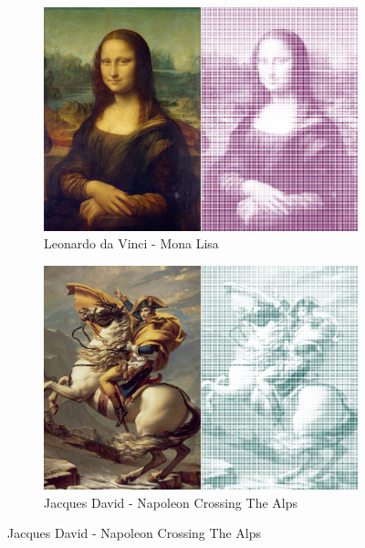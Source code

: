 \begin{figure}[H]
    \begin{subfigure}[b]{0.45\textwidth}
        \centering
        \includegraphics[width=\textwidth]{Figures/day_1/mona_lisa.png}
        \caption{Leonardo da Vinci - Mona Lisa}
    \end{subfigure}
    \hspace{1cm}
    \begin{subfigure}[b]{0.45\textwidth}
        \centering

        \includegraphics[width=\textwidth]{Figures/day_1/napoleon.png}
        \caption{Jacques David - Napoleon Crossing The Alps}
    \end{subfigure}


\end{figure}
